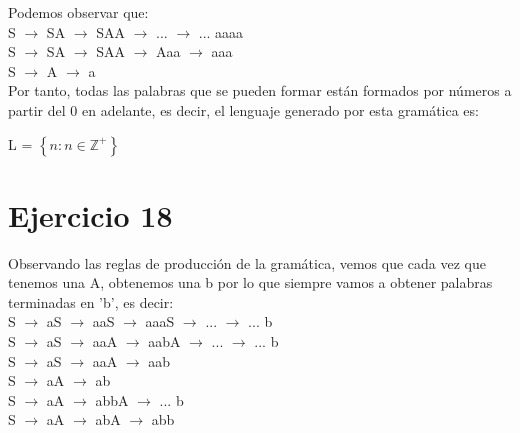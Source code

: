 Podemos observar que: \\

S $\rightarrow$ SA $\rightarrow$ SAA $\rightarrow$ ... $\rightarrow$ ... aaaa \\
S $\rightarrow$ SA $\rightarrow$ SAA $\rightarrow$ Aaa $\rightarrow$ aaa \\
S $\rightarrow$ A $\rightarrow$ a \\

Por tanto, todas las palabras que se pueden formar están formados por números a partir del 0 en adelante, es decir, el lenguaje generado por esta gramática es:

\begin{center}
	
	L = $\left\lbrace n: n \in \mathbb{Z}^+ \right\rbrace$
\end{center}





\newpage
\section{Ejercicio 18}

Observando las reglas de producción de la gramática, vemos que cada vez que tenemos una A, obtenemos una b por lo que siempre vamos a obtener palabras terminadas en 'b', es decir: \\

S $\rightarrow$ aS $\rightarrow$ aaS $\rightarrow$ aaaS $\rightarrow$ ... $\rightarrow$ ... b \\
S $\rightarrow$ aS $\rightarrow$ aaA $\rightarrow$ aabA $\rightarrow$ ... $\rightarrow$ ... b \\
S $\rightarrow$ aS $\rightarrow$ aaA $\rightarrow$ aab\\
S $\rightarrow$ aA $\rightarrow$ ab\\
S $\rightarrow$ aA $\rightarrow$ abbA $\rightarrow$ ... b\\
S $\rightarrow$ aA $\rightarrow$ abA $\rightarrow$ abb\\

